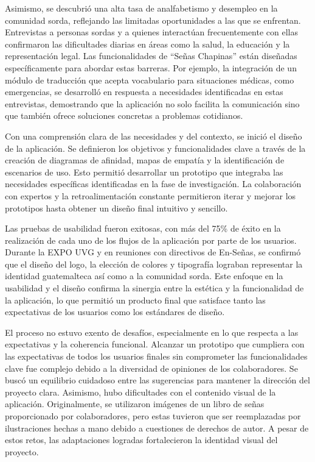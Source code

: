 Asimismo, se descubrió una alta tasa de analfabetismo y desempleo en la comunidad sorda, reflejando las limitadas oportunidades a las que se enfrentan. Entrevistas a personas sordas y a quienes interactúan frecuentemente con ellas confirmaron las dificultades diarias en áreas como la salud, la educación y la representación legal. Las funcionalidades de ``Señas Chapinas'' están diseñadas específicamente para abordar estas barreras. Por ejemplo, la integración de un módulo de traducción que acepta vocabulario para situaciones médicas, como emergencias, se desarrolló en respuesta a necesidades identificadas en estas entrevistas, demostrando que la aplicación no solo facilita la comunicación sino que también ofrece soluciones concretas a problemas cotidianos.

Con una comprensión clara de las necesidades y del contexto, se inició el diseño de la aplicación. Se definieron los objetivos y funcionalidades clave a través de la creación de diagramas de afinidad, mapas de empatía y la identificación de escenarios de uso. Esto permitió desarrollar un prototipo que integraba las necesidades específicas identificadas en la fase de investigación. La colaboración con expertos y la retroalimentación constante permitieron iterar y mejorar los prototipos hasta obtener un diseño final intuitivo y sencillo.

Las pruebas de usabilidad fueron exitosas, con más del 75\% de éxito en la realización de cada uno de los flujos de la aplicación por parte de los usuarios. Durante la EXPO UVG y en reuniones con directivos de En-Señas, se confirmó que el diseño del logo, la elección de colores y tipografía lograban representar la identidad guatemalteca así como a la comunidad sorda. Este enfoque en la usabilidad y el diseño confirma la sinergia entre la estética y la funcionalidad de la aplicación, lo que permitió un producto final que satisface tanto las expectativas de los usuarios como los estándares de diseño.

El proceso no estuvo exento de desafíos, especialmente en lo que respecta a las expectativas y la coherencia funcional. Alcanzar un prototipo que cumpliera con las expectativas de todos los usuarios finales sin comprometer las funcionalidades clave fue complejo debido a la diversidad de opiniones de los colaboradores. Se buscó un equilibrio cuidadoso entre las sugerencias para mantener la dirección del proyecto clara. Asimismo, hubo dificultades con el contenido visual de la aplicación. Originalmente, se utilizaron imágenes de un libro de señas proporcionado por colaboradores, pero estas tuvieron que ser reemplazadas por ilustraciones hechas a mano debido a cuestiones de derechos de autor. A pesar de estos retos, las adaptaciones logradas fortalecieron la identidad visual del proyecto.

